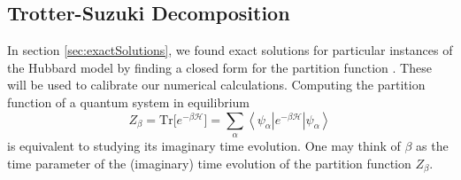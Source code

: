 \subsection{Trotter-Suzuki Decomposition}
\label{subsec:trotter}

In section \ref{sec:exactSolutions}, we found exact solutions for particular instances of the Hubbard model by finding a closed form for the partition function \cite{hou_numerical_2009}. These will be used to calibrate our numerical calculations.
Computing the partition function of a quantum system in equilibrium
\begin{equation}\label{eq:partitionBeta}
Z_\beta = \text{Tr} \big[ e^{-\beta \mathcal{H} } \big] = \sum_{\alpha} \left\langle \psi_\alpha | e^{-\beta \mathcal{H} } | \psi_\alpha \right\rangle
\end{equation}
is equivalent to studying its imaginary time evolution.
One may think of $\beta$ as the time parameter of the (imaginary) time evolution of the partition function $Z_\beta$.
%
%
%
%
%
